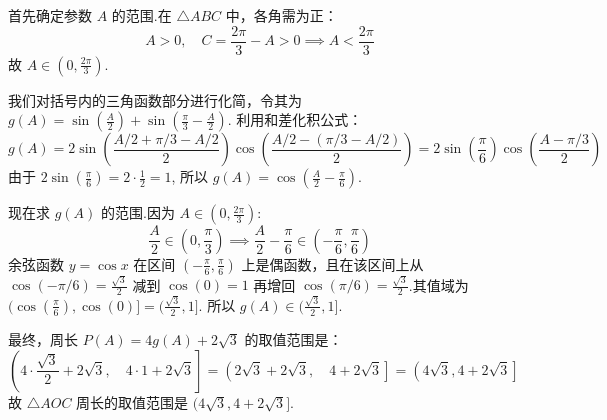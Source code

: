 \begin{solution}
	首先确定参数 $A$ 的范围.在 $\triangle ABC$ 中，各角需为正：
	\[
	A>0, \quad C = \frac{2\pi}{3}-A > 0 \implies A < \frac{2\pi}{3}
	\]
	故 $A \in (0, \frac{2\pi}{3})$.
	
	我们对括号内的三角函数部分进行化简，令其为 $g(A) = \sin(\frac{A}{2}) + \sin(\frac{\pi}{3}-\frac{A}{2})$.
	利用和差化积公式：
	\[
	g(A) = 2\sin\left(\frac{A/2 + \pi/3-A/2}{2}\right)\cos\left(\frac{A/2 - (\pi/3-A/2)}{2}\right) = 2\sin\left(\frac{\pi}{6}\right)\cos\left(\frac{A-\pi/3}{2}\right)
	\]
	由于 $2\sin(\frac{\pi}{6}) = 2 \cdot \frac{1}{2} = 1$, 所以 $g(A) = \cos\left(\frac{A}{2}-\frac{\pi}{6}\right)$.
	
	现在求 $g(A)$ 的范围.因为 $A \in (0, \frac{2\pi}{3})$:
	\[
	\frac{A}{2} \in \left(0, \frac{\pi}{3}\right) \implies \frac{A}{2}-\frac{\pi}{6} \in \left(-\frac{\pi}{6}, \frac{\pi}{6}\right)
	\]
	余弦函数 $y=\cos x$ 在区间 $(-\frac{\pi}{6}, \frac{\pi}{6})$ 上是偶函数，且在该区间上从 $\cos(-\pi/6)=\frac{\sqrt{3}}{2}$ 减到 $\cos(0)=1$ 再增回 $\cos(\pi/6)=\frac{\sqrt{3}}{2}$.其值域为 $(\cos(\frac{\pi}{6}), \cos(0)] = (\frac{\sqrt{3}}{2}, 1]$.
	所以 $g(A) \in (\frac{\sqrt{3}}{2}, 1]$.
	
	最终，周长 $P(A) = 4g(A) + 2\sqrt{3}$ 的取值范围是：
	\[
	\left(4 \cdot \frac{\sqrt{3}}{2} + 2\sqrt{3}, \quad 4 \cdot 1 + 2\sqrt{3}\right] = \left(2\sqrt{3} + 2\sqrt{3}, \quad 4 + 2\sqrt{3}\right] = \left(4\sqrt{3}, 4+2\sqrt{3}\right]
	\]
	故 $\triangle AOC$ 周长的取值范围是 $(4\sqrt{3}, 4+2\sqrt{3}]$.\hfill\qedsymbol
\end{solution}

